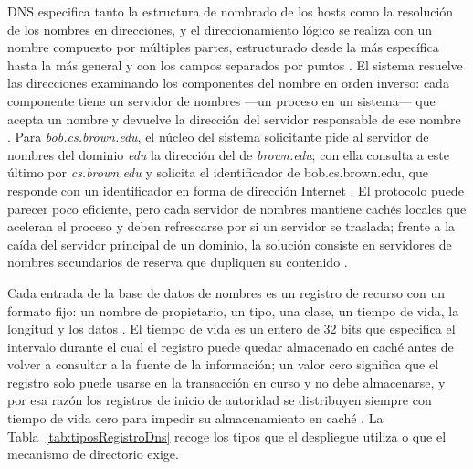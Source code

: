 \documentclass[12pt]{article}
\begin{document}
DNS especifica tanto la estructura de nombrado de los hosts como la resolución de los nombres en direcciones, y el direccionamiento lógico se realiza con un nombre compuesto por múltiples partes, estructurado desde la más específica hasta la más general y con los campos separados por puntos \parencite[\S 16.5.1, p.\ 568]{silberschatz2006fundamentos}. El sistema resuelve las direcciones examinando los componentes del nombre en orden inverso: cada componente tiene un servidor de nombres ---un proceso en un sistema--- que acepta un nombre y devuelve la dirección del servidor responsable de ese nombre \parencite[\S 16.5.1, p.\ 568]{silberschatz2006fundamentos}. Para \textit{bob.cs.brown.edu}, el núcleo del sistema solicitante pide al servidor de nombres del dominio \textit{edu} la dirección del de \textit{brown.edu}; con ella consulta a este último por \textit{cs.brown.edu} y solicita el identificador de bob.cs.brown.edu, que responde con un identificador en forma de dirección Internet \parencite[\S 16.5.1, p.\ 568]{silberschatz2006fundamentos}. El protocolo puede parecer poco eficiente, pero cada servidor de nombres mantiene cachés locales que aceleran el proceso y deben refrescarse por si un servidor se traslada; frente a la caída del servidor principal de un dominio, la solución consiste en servidores de nombres secundarios de reserva que dupliquen su contenido \parencite[\S 16.5.1, p.\ 569]{silberschatz2006fundamentos}.

Cada entrada de la base de datos de nombres es un registro de recurso con un formato fijo: un nombre de propietario, un tipo, una clase, un tiempo de vida, la longitud y los datos \parencite[\S 3.2.1, p.\ 11]{rfc1035}. El tiempo de vida es un entero de 32 bits que especifica el intervalo durante el cual el registro puede quedar almacenado en caché antes de volver a consultar a la fuente de la información; un valor cero significa que el registro solo puede usarse en la transacción en curso y no debe almacenarse, y por esa razón los registros de inicio de autoridad se distribuyen siempre con tiempo de vida cero para impedir su almacenamiento en caché \parencite[\S 3.2.1, p.\ 11]{rfc1035}. La Tabla~\ref{tab:tiposRegistroDns} recoge los tipos que el despliegue utiliza o que el mecanismo de directorio exige.
\end{document}
